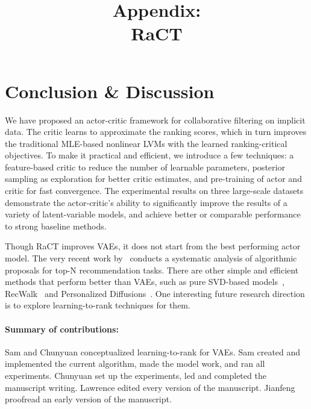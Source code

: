 \documentclass{article} \usepackage{iclr2020_conference,times}
\begin{document}
\section{Conclusion \& Discussion} We have proposed an actor-critic framework for collaborative filtering on implicit data. The critic learns to approximate the ranking scores, which in turn improves the traditional MLE-based nonlinear LVMs with the learned ranking-critical objectives.
To make it practical and efficient, we introduce a few techniques: a feature-based critic to reduce the number of learnable parameters, posterior sampling as exploration for better critic estimates, and pre-training of actor and critic for fast convergence.
The experimental results on three large-scale datasets demonstrate the actor-critic's ability to significantly improve the results of a variety of latent-variable models, and achieve better or comparable performance to strong baseline methods.


Though RaCT improves VAEs, it does not start from the best performing actor model. The very recent work by~\citet{dacrema2019we} conducts a systematic analysis of algorithmic proposals for top-N recommendation tasks. There are other simple and efficient methods that perform better than VAEs, such as pure SVD-based models~\citep{cremonesi2010performance,nikolakopoulos2019eigenrec}, RecWalk~\citep{nikolakopoulos2019recwalk} and Personalized Diffusions~\citep{nikolakopoulos2019personalized}.
One interesting future research direction is to explore learning-to-rank techniques for them.






\medskip

\small





\normalsize

\appendix
\newpage
\title{\Large Appendix: \\
RaCT}

\paragraph{Summary of contributions: }  Sam and Chunyuan conceptualized learning-to-rank for VAEs. Sam created and implemented the current algorithm, made the model work, and ran all experiments. Chunyuan set up the experiments, led and completed the manuscript writing. Lawrence edited every version of the manuscript. Jianfeng proofread an early version of the manuscript. 
\end{document}

